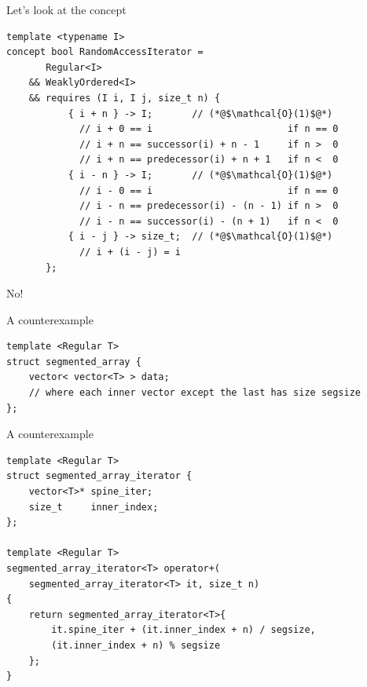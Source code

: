 \documentclass[aspectratio=169]{beamer}
\begin{document}

\begin{frame}[fragile]{Let's look at the concept}
  \footnotesize
\begin{lstlisting}
template <typename I>
concept bool RandomAccessIterator =
       Regular<I>
    && WeaklyOrdered<I>
    && requires (I i, I j, size_t n) {
           { i + n } -> I;       // (*@$\mathcal{O}(1)$@*)
             // i + 0 == i                        if n == 0
             // i + n == successor(i) + n - 1     if n >  0
             // i + n == predecessor(i) + n + 1   if n <  0
           { i - n } -> I;       // (*@$\mathcal{O}(1)$@*)
             // i - 0 == i                        if n == 0
             // i - n == predecessor(i) - (n - 1) if n >  0
             // i - n == successor(i) - (n + 1)   if n <  0
           { i - j } -> size_t;  // (*@$\mathcal{O}(1)$@*)
             // i + (i - j) = i
       };
\end{lstlisting}
\end{frame}


\begin{frame}[standout]
  No!
\end{frame}


\begin{frame}[fragile]{A counterexample}
  \small
\begin{lstlisting}
template <Regular T>
struct segmented_array {
    vector< vector<T> > data;
    // where each inner vector except the last has size segsize
};
\end{lstlisting}
\end{frame}


\begin{frame}[fragile]{A counterexample}
  \small
\begin{lstlisting}
template <Regular T>
struct segmented_array_iterator {
    vector<T>* spine_iter;
    size_t     inner_index;
};

template <Regular T>
segmented_array_iterator<T> operator+(
    segmented_array_iterator<T> it, size_t n)
{
    return segmented_array_iterator<T>{
        it.spine_iter + (it.inner_index + n) / segsize,
        (it.inner_index + n) % segsize
    };
}
\end{lstlisting}
\end{frame}
\end{document}
